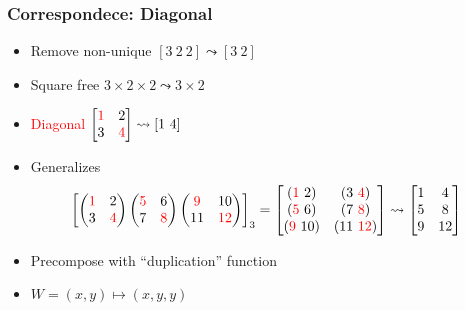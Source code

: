 \documentclass[xetex,mathserif,serif]{beamer}
\newcommand\NB[1]{\textcolor{red}{#1}}
\begin{document}
\begin{frame}
  \frametitle{Correspondece: Diagonal}
  \pause
  \begin{itemize}[<+->]
    \item Remove non-unique \([3\ 2\ 2] \leadsto [3\ 2]\)
    \item Square free \(3\times 2\times 2\leadsto 3 \times 2\)
    \item \NB{Diagonal} \(
      \begin{bmatrix}
        \NB 1 & 2 \\
        3 & \NB 4
      \end{bmatrix} \leadsto [1\ 4]
      \)
    \item Generalizes \[
      \!\!\!\!
      \begin{bmatrix}
        \begin{pmatrix}
          \NB 1 & 2 \\ 3 &\NB  4
        \end{pmatrix}
        \begin{pmatrix}
          \NB 5 & 6 \\ 7 & \NB 8
        \end{pmatrix}
        \begin{pmatrix}
          \NB 9 & 10 \\ 11 & \NB{12}
        \end{pmatrix}
      \end{bmatrix}_3 = 
      \begin{bmatrix}
        (\NB 1\ 2) & (3\ \NB 4) \\
        (\NB 5\ 6) & (7\ \NB 8) \\
        (\NB 9\ 10) & (11\ \NB{12})
      \end{bmatrix} \leadsto
      \begin{bmatrix}
        1 & 4 \\
        5 & 8 \\
        9 & 12 
      \end{bmatrix}
      \]
    \item Precompose with ``duplication'' function
    \item \(W = (x, y) \mapsto (x, y, y)\)
  \end{itemize}
\end{frame}
\end{document}
